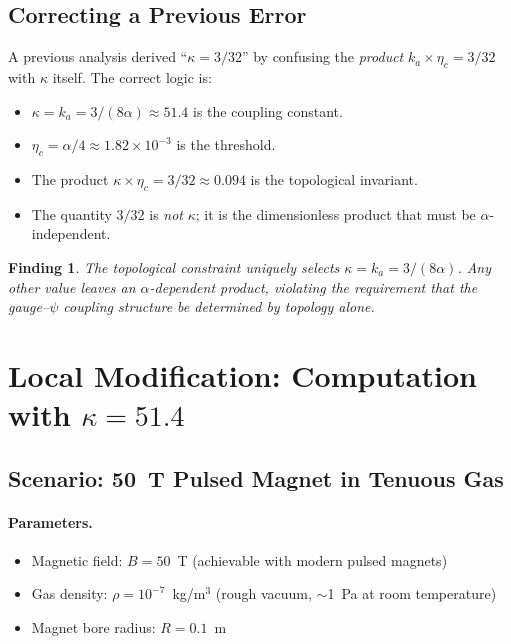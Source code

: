 \documentclass[12pt,a4paper]{article}
\newtheorem{finding}{Finding}
\theoremstyle{remark}
\begin{document}
\subsection{Correcting a Previous Error}

A previous analysis derived ``$\kappa = 3/32$'' by confusing the
\emph{product} $k_a \times \eta_c = 3/32$ with $\kappa$ itself. The correct
logic is:
\begin{itemize}
\item $\kappa = k_a = 3/(8\alpha) \approx 51.4$ is the coupling constant.
\item $\eta_c = \alpha/4 \approx 1.82 \times 10^{-3}$ is the threshold.
\item The product $\kappa \times \eta_c = 3/32 \approx 0.094$ is the
  topological invariant.
\item The quantity $3/32$ is \emph{not} $\kappa$; it is the dimensionless
  product that must be $\alpha$-independent.
\end{itemize}

\begin{finding}
The topological constraint uniquely selects $\kappa = k_a = 3/(8\alpha)$.
Any other value leaves an $\alpha$-dependent product, violating the
requirement that the gauge--$\psi$ coupling structure be determined by
topology alone.
\end{finding}

\section{Local Modification: Computation with $\kappa = 51.4$}

\subsection{Scenario: 50~T Pulsed Magnet in Tenuous Gas}

\paragraph{Parameters.}
\begin{itemize}
\item Magnetic field: $B = 50$~T (achievable with modern pulsed magnets)
\item Gas density: $\rho = 10^{-7}$~kg/m$^3$ (rough vacuum, $\sim$1~Pa at room temperature)
\item Magnet bore radius: $R = 0.1$~m
\end{itemize}
\end{document}
